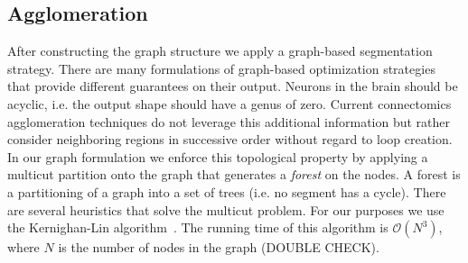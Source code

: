 \subsection{Agglomeration}

After constructing the graph structure we apply a graph-based segmentation strategy. 
There are many formulations of graph-based optimization strategies that provide different guarantees on their output. 
Neurons in the brain should be acyclic, i.e. the output shape should have a genus of zero. 
Current connectomics agglomeration techniques do not leverage this additional information but rather consider neighboring regions in successive order without regard to loop creation. 
In our graph formulation we enforce this topological property by applying a multicut partition onto the graph that generates a \textit{forest} on the nodes. 
A forest is a partitioning of a graph into a set of trees (i.e. no segment has a cycle). 
There are several heuristics that solve the multicut problem. For our purposes we use the Kernighan-Lin algorithm~\cite{kernighan1970efficient}.
The running time of this algorithm is $\mathcal{O}(N^3)$, where $N$ is the number of nodes in the graph (DOUBLE CHECK). 